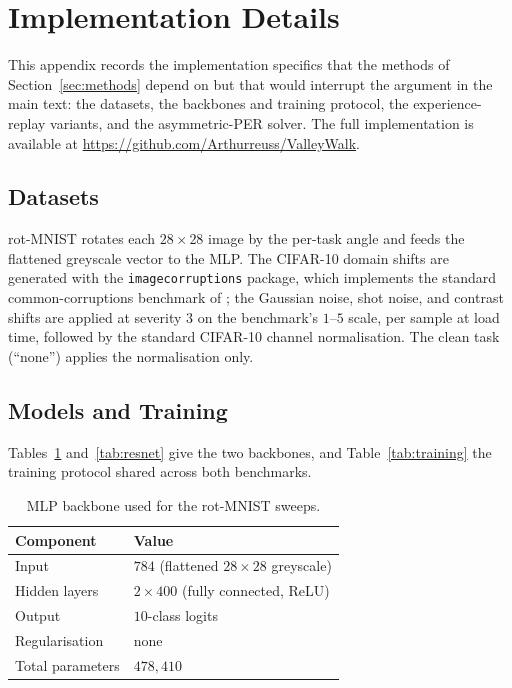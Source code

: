 \section{Implementation Details}
\label{app:implementation}

This appendix records the implementation specifics that the methods of Section~\ref{sec:methods} depend on but that would interrupt the argument in the main text: the datasets, the backbones and training protocol, the experience-replay variants, and the asymmetric-PER solver. The full implementation is available at \url{https://github.com/Arthurreuss/ValleyWalk}.

\subsection{Datasets}
\label{app:impl_data}

rot-MNIST rotates each $28\times28$ image by the per-task angle and feeds the flattened greyscale vector to the MLP. The CIFAR-10 domain shifts are generated with the \texttt{imagecorruptions} package, which implements the standard common-corruptions benchmark of \citet{hendrycks2019robustness}; the Gaussian noise, shot noise, and contrast shifts are applied at severity $3$ on the benchmark's $1$--$5$ scale, per sample at load time, followed by the standard CIFAR-10 channel normalisation. The clean task (``none'') applies the normalisation only.

\subsection{Models and Training}
\label{app:impl_models}

Tables~\ref{tab:mlp} and~\ref{tab:resnet} give the two backbones, and Table~\ref{tab:training} the training protocol shared across both benchmarks.

\begin{table}[H]
    \centering
    \small
    \begin{tabular}{@{}l p{}@{}}
        \hline
        Component        & Value                                    \\
        \hline
        Input            & $784$ (flattened $28\times28$ greyscale) \\
        Hidden layers    & $2 \times 400$ (fully connected, ReLU)   \\
        Output           & $10$-class logits                        \\
        Regularisation   & none                                     \\
        Total parameters & $478{,}410$                              \\
        \hline
    \end{tabular}
    \caption{MLP backbone used for the rot-MNIST sweeps.}
    \label{tab:mlp}
\end{table}

